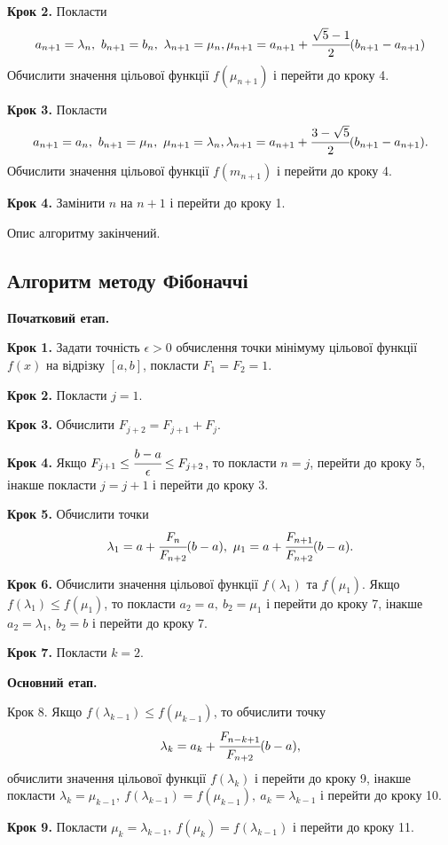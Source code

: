 \documentclass[14pt,a4paper]{extarticle}
\theoremstyle{definition}
\newcommand{\sep}{ , \ \allowbreak }
\begin{document}
\textbf{Крок 2.} Покласти
\[a_{n+1}= \lambda_n \sep b_{n+1} = b_n \sep \lambda_{n+1}=\mu_n,
\mu_{n+1} = a_{n+1}+\cfrac{\sqrt{5}-1}2(b_{n+1}-a_{n+1})\]
Обчислити значення цільової функції $f(\mu_{n+1})$ і перейти до кроку 4.

\textbf{Крок 3.} Покласти
\[a_{n+1}= a_n \sep b_{n+1} = \mu_n \sep \mu_{n+1}=\lambda_n,
\lambda_{n+1} = a_{n+1}+\cfrac{3-\sqrt{5}}2(b_{n+1}-a_{n+1}).\]
Обчислити значення цільової функції $f(m_{n+1})$ і перейти до кроку 4.

\textbf{Крок 4.} Замінити $n$ на $n + 1$ і перейти до кроку 1.

Опис алгоритму закінчений.

\subsection{Алгоритм методу Фібоначчі}

\textbf{Початковий етап.}

\textbf{Крок 1.} Задати точність $\epsilon > 0$ обчислення точки мінімуму цільової функції $f(x)$ на відрізку $[a,b]$, покласти $F_1=F_2=1$.

\textbf{Крок 2.} Покласти $j=1$.

\textbf{Крок 3.} Обчислити $F_{j+2} = F_{j+1} + F_j$.

\textbf{Крок 4.} Якщо $F_{j+1} \leq \cfrac{b-a}\epsilon \leq F_{j+2}$, то покласти $n=j$, перейти до кроку 5, інакше покласти $j=j+1$ і перейти до кроку 3.

\textbf{Крок 5.} Обчислити точки
\[\lambda_1=a+\cfrac{F_n}{F_{n+2}}(b-a) \sep \mu_1=a+\cfrac{F_{n+1}}{F_{n+2}}(b-a).\]

\textbf{Крок 6.} Обчислити значення цільової функції $f(\lambda_1)$ та $f(\mu_1)$. Якщо $f(\lambda_1) \leq f(\mu_1)$, то покласти $a_2=a \sep b_2=\mu_1$ і перейти до кроку 7, інакше $a_2=\lambda_1 \sep b_2=b$ і перейти до кроку 7.

\textbf{Крок 7.} Покласти $k=2$.

\textbf{Основний етап.}

{Крок 8.} Якщо $f(\lambda_{k-1}) \leq f(\mu_{k-1})$, то обчислити точку
\[\lambda_k=a_k+\cfrac{F_{n-k+1}}{F_{n+2}}(b-a),\]
обчислити значення цільової функції $f(\lambda_k)$ і перейти до кроку 9, інакше покласти $\lambda_k = \mu_{k-1} \sep f(\lambda_{k-1}) = f(\mu_{k-1}) \sep a_k = \lambda_{k-1}$ і перейти до кроку 10.

\textbf{Крок 9.} Покласти $\mu_k=\lambda_{k-1} \sep f(\mu_k) = f(\lambda_{k-1})$ і перейти до кроку 11.
\end{document}
